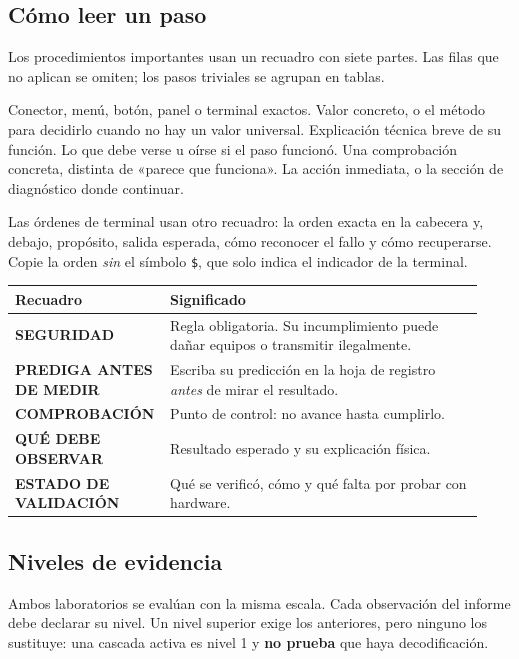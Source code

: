 \subsection{Cómo leer un paso}

Los procedimientos importantes usan un recuadro con siete partes. Las filas que no aplican se omiten; los pasos triviales se agrupan en tablas.

{Conector, menú, botón, panel o terminal exactos.}
{Valor concreto, o el método para decidirlo cuando no hay un valor universal.}
{Explicación técnica breve de su función.}
{Lo que debe verse u oírse si el paso funcionó.}
{Una comprobación concreta, distinta de «parece que funciona».}
{La acción inmediata, o la sección de diagnóstico donde continuar.}

Las órdenes de terminal usan otro recuadro: la orden exacta en la cabecera y, debajo, propósito, salida esperada, cómo reconocer el fallo y cómo recuperarse. Copie la orden \emph{sin} el símbolo \texttt{\$}, que solo indica el indicador de la terminal.

\begin{longtable}{@{}>{\raggedright\arraybackslash}p{0.27\linewidth}>{\raggedright\arraybackslash}p{0.66\linewidth}@{}}
\toprule
\textbf{Recuadro} & \textbf{Significado} \\
\midrule
\endhead
\textsf{\textbf{\color{MADanger}SEGURIDAD}} & Regla obligatoria. Su incumplimiento puede dañar equipos o transmitir ilegalmente. \\
\textsf{\textbf{\color{MAWarning}PREDIGA ANTES DE MEDIR}} & Escriba su predicción en la hoja de registro \emph{antes} de mirar el resultado. \\
\textsf{\textbf{\color{MAWarning}COMPROBACIÓN}} & Punto de control: no avance hasta cumplirlo. \\
\textsf{\textbf{\color{MASuccess}QUÉ DEBE OBSERVAR}} & Resultado esperado y su explicación física. \\
\textsf{\textbf{\color{MATertiary}ESTADO DE VALIDACIÓN}} & Qué se verificó, cómo y qué falta por probar con hardware. \\
\bottomrule
\end{longtable}

\subsection{Niveles de evidencia}
\label{sec:niveles}

Ambos laboratorios se evalúan con la misma escala. Cada observación del informe debe declarar su nivel. Un nivel superior exige los anteriores, pero ninguno los sustituye: una cascada activa es nivel 1 y \textbf{no prueba} que haya decodificación.

